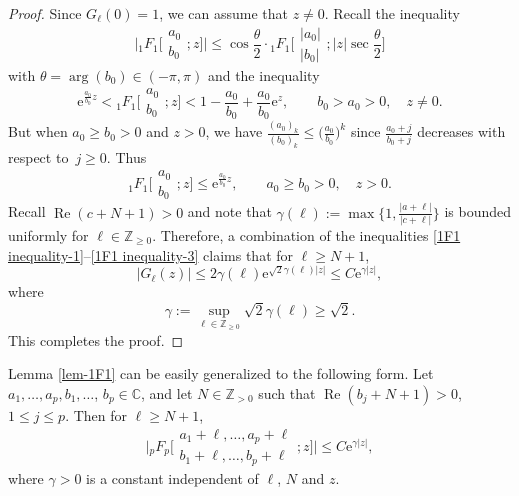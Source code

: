 \documentclass[pdftex]{sigma}
\numberwithin{equation}{section}
\newcommand{\CC}{\ensuremath{\mathbb{C}}}
\newcommand{\ZZ}{\ensuremath{\mathbb{Z}}}
\newcommand{\me}{\mathrm{e}}
\begin{document}
\begin{proof}
	Since $G_{\ell}(0)=1$, we can assume that $z\ne 0$. Recall the inequality \cite[equation~(2.3)]{Joshi_Arya-1982}
	\begin{equation}\label{1F1 inequality-1}
		\biggl|{}_1F_1\bigg[\begin{matrix}
			a_0\\
			b_0
		\end{matrix};z\bigg]\biggr|\leqslant \cos\frac{\theta}{2}\cdot
		{}_1F_1\biggl[\begin{matrix}
			|a_0|\\
			|b_0|
		\end{matrix};|z|\sec\frac{\theta}{2}\bigg]
	\end{equation}
	with $\theta=\arg(b_0)\in (-\pi,\pi)$ and the inequality \cite[p. 37, equation~(3.5)]{Carlson-1966}
	\begin{equation}\label{1F1 inequality-2}
		\me^{\frac{a_0}{b_0}z}<{}_1F_1\biggl[\begin{matrix}
			a_0\\
			b_0
		\end{matrix};z\biggr]<1-\frac{a_0}{b_0}+\frac{a_0}{b_0}\me^z,\qquad b_0>a_0>0,\quad z\ne 0.
	\end{equation}
	But when $a_0\geqslant b_0>0$ and $z>0$, we have $\frac{(a_0)_k}{(b_0)_k}\leqslant \big(\frac{a_0}{b_0}\big)^k$ since $\frac{a_0+j}{b_0+j}$ decreases with respect to~${j\geqslant 0}$. Thus
	\begin{equation}\label{1F1 inequality-3}
		{}_1F_1\biggl[\begin{matrix}
			a_0\\
			b_0
		\end{matrix};z\biggr]\leqslant\me^{\frac{a_0}{b_0}z},\qquad a_0\geqslant b_0>0,\quad z>0.
	\end{equation}
	Recall $\operatorname{Re}(c+N+1)>0$ and note that $\gamma(\ell):=\max\bigl\{1,\frac{|a+\ell|}{|c+\ell|}\bigr\}$ is bounded uniformly for $\ell\in\ZZ_{\geqslant 0}$. Therefore, a combination of the inequalities \eqref{1F1 inequality-1}--\eqref{1F1 inequality-3} claims that for $\ell\geqslant N+1$,
	\[|G_\ell(z)|\leqslant 2\gamma(\ell)\me^{\sqrt{2}\gamma(\ell)|z|}\leqslant C\me^{\gamma|z|},\]
	where
	\[\gamma:=\sup_{\ell\in\ZZ_{\geqslant 0}}\sqrt{2}\gamma(\ell)\geqslant \sqrt{2}.\]
	This completes the proof.
\end{proof}

\begin{Remark}
	Lemma \ref{lem-1F1} can be easily generalized to the following form. Let $a_1,\dots,a_p,b_1,\dots$, $b_p\in\CC$, and let $N\in\ZZ_{>0}$ such that $\operatorname{Re}(b_j+N+1)>0$, $1\leqslant j\leqslant p$. Then for $\ell\geqslant N+1$,
		\begin{equation}\label{pFp estimate}
			\biggl|{}_pF_p\biggl[\begin{matrix}
				a_1+\ell,\dots,a_p+\ell\\
				b_1+\ell,\dots,b_p+\ell
			\end{matrix};z\biggr]\biggr|\leqslant C\me^{\gamma|z|},
		\end{equation}
		where $\gamma>0$ is a constant independent of $\ell$, $N$ and $z$.
\end{Remark}
\end{document}
